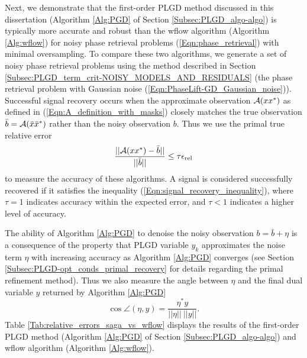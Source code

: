 Next, we demonstrate that the first-order PLGD method discussed in this dissertation (Algorithm \ref{Alg:PGD} of Section \ref{Subsec:PLGD_algo-algo}) is typically more accurate and robust than the wflow algorithm (Algorithm \ref{Alg:wflow}) for noisy phase retrieval problems (\ref{Eqn:phase_retrieval}) with minimal oversampling.
To compare these two algorithms, we generate a set of noisy phase retrieval problems using the method described in Section \ref{Subsec:PLGD_term_crit-NOISY_MODELS_AND_RESIDUALS} (the phase retrieval problem with Gaussian noise (\ref{Eqn:PhaseLift-GD_Gaussian_noise})).
Successful signal recovery occurs when the approximate observation ${\mathcal A}(xx^*)$ as defined in (\ref{Eqn:A_definition_with_masks}) closely matches the true observation $\bar{b} = {\mathcal A}(\bar{x}\bar{x}^*)$ rather than the noisy observation $b$.  
Thus we use the primal true relative error 
\begin{equation} 	\label{Eqn:signal_recovery_inequality}
\frac{||{\mathcal A}(xx^*)-\bar{b}||}{ ||\bar{b}|| } \leq \tau \epsilon_{\textnormal{rel}}
\end{equation}
to measure the accuracy of these algorithms.  
A signal is considered successfully recovered if it satisfies the inequality (\ref{Eqn:signal_recovery_inequality}), where $\tau = 1$ indicates accuracy within the expected error, and $\tau < 1$ indicates a higher level of accuracy.  



The ability of Algorithm \ref{Alg:PGD} to denoise the noisy observation $b = \bar{b} + \eta$ is a consequence of the property that PLGD variable $y_k$ approximates the noise term $\eta$ with increasing accuracy as Algorithm \ref{Alg:PGD} converges (see Section \ref{Subsec:PLGD-opt_conds_primal_recovery} for details regarding the primal refinement method).
Thus we also measure the angle between $\eta$ and the final dual variable $y$ returned by Algorithm \ref{Alg:PGD}
\begin{equation} 			\label{Eqn:angle_eta_y}
	\cos \angle (\eta, y)	=	\frac{\eta^*y}{||\eta|| \ ||y||}.
\end{equation}
Table \ref{Tab:relative_errors_saga_vs_wflow} displays the results of the first-order PLGD method (Algorithm \ref{Alg:PGD} of Section \ref{Subsec:PLGD_algo-algo}) and wflow algorithm (Algorithm \ref{Alg:wflow}).


